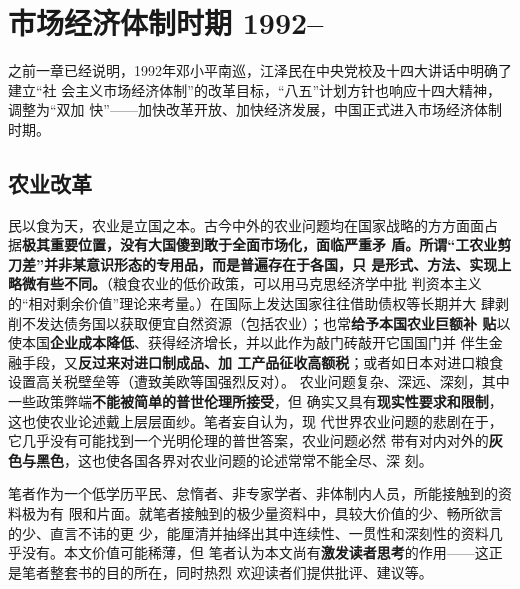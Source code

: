 \chapter{市场经济体制时期 1992--}

之前一章已经说明，1992年邓小平南巡，江泽民在中央党校及十四大讲话中明确了建立“社
会主义市场经济体制”的改革目标，“八五”计划方针也响应十四大精神，调整为“双加
快”——加快改革开放、加快经济发展，中国正式进入市场经济体制时期。


\section{农业改革}








民以食为天，农业是立国之本。古今中外的农业问题均在国家战略的方方面面占
据\textbf{极其重要位置，没有大国傻到敢于全面市场化，面临严重矛
  盾。}\textbf{所谓“工农业剪刀差”并非某意识形态的专用品，而是普遍存在于各国，只
  是形式、方法、实现上略微有些不同。}（粮食农业的低价政策，可以用马克思经济学中批
判资本主义的“相对剩余价值”理论来考量。）在国际上发达国家往往借助债权等长期并大
肆剥削不发达债务国以获取便宜自然资源（包括农业）；也常\textbf{给予本国农业巨额补
  贴}以使本国\textbf{企业成本降低}、获得经济增长，并以此作为敲门砖敲开它国国门并
伴生金融手段，又\textbf{反过来对进口制成品、加
  工产品征收高额税}；或者如日本对进口粮食设置高关税壁垒等（遭致美欧等国强烈反对）。
农业问题复杂、深远、深刻，其中一些政策弊端\textbf{不能被简单的普世伦理所接受}，但
确实又具有\textbf{现实性要求和限制}，这也使农业论述戴上层层面纱。笔者妄自认为，现
代世界农业问题的悲剧在于，它几乎没有可能找到一个光明伦理的普世答案，农业问题必然
带有对内对外的\textbf{灰色与黑色}，这也使各国各界对农业问题的论述常常不能全尽、深
刻。

笔者作为一个低学历平民、怠惰者、非专家学者、非体制内人员，所能接触到的资料极为有
限和片面。就笔者接触到的极少量资料中，具较大价值的少、畅所欲言的少、直言不讳的更
少，能厘清并抽绎出其中连续性、一贯性和深刻性的资料几乎没有。本文价值可能稀薄，但
笔者认为本文尚有\textbf{激发读者思考}的作用——这正是笔者整套书的目的所在，同时热烈
欢迎读者们提供批评、建议等。

